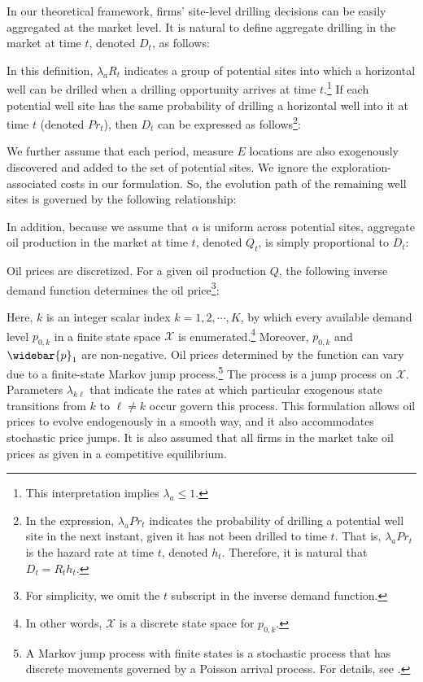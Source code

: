 In our theoretical framework, firms' site-level drilling decisions can be easily aggregated at the market level. It is natural to define aggregate drilling in the market at time $t$, denoted $D_{t}$, as follows:

In this definition, $\lambda_{a} R_{t}$ indicates a group of potential sites into which a horizontal well can be drilled when a drilling opportunity arrives at time $t$.\footnote{This interpretation implies $\lambda_{a} \leq 1$.} If each potential well site has the same probability of drilling a horizontal well into it at time $t$ (denoted $Pr_{t}$), then $D_{t}$ can be expressed as follows\footnote{In the expression, $\lambda_{a} Pr_{t}$ indicates the probability of drilling a potential well site in the next instant, given it has not been drilled to time $t$. That is, $\lambda_{a} Pr_{t}$ is the hazard rate at time $t$, denoted $h_{t}$. Therefore, it is natural that $D_{t} = R_{t} h_{t}$.}:

We further assume that each period, measure $E$ locations are also exogenously discovered and added to the set of potential sites. We ignore the exploration-associated costs in our formulation. So, the evolution path of the remaining well sites is governed by the following relationship:

In addition, because we assume that $\alpha$ is uniform across potential sites, aggregate oil production in the market at time $t$, denoted $Q_{t}$, is simply proportional to $D_{t}$:


Oil prices are discretized. For a given oil production $Q$, the following inverse demand function determines the oil price\footnote{For simplicity, we omit the $t$ subscript in the inverse demand function.}:

Here, $k$ is an integer scalar index $k = 1, 2, \cdots, K$, by which every available demand level $p_{0,k}$ in a finite state space $\mathcal{X}$ is enumerated.\footnote{In other words, $\mathcal{X}$ is a discrete state space for $p_{0,k}$.} Moreover, $p_{0,k}$ and $\widebar{p}_{1}$ are non-negative. Oil prices determined by the function can vary due to a finite-state Markov jump process.\footnote{A Markov jump process with finite states is a stochastic process that has discrete movements governed by a Poisson arrival process. For details, see \cite{Time-Discretization-of-Markov-Chains_Doytchinov-and-Irby_2010}.} The process is a jump process on $\mathcal{X}$. Parameters $\lambda_{k\ell}$ that indicate the rates at which particular exogenous state transitions from $k$ to $\ell \neq k$ occur govern this process. This formulation allows oil prices to evolve endogenously in a smooth way, and it also accommodates stochastic price jumps. It is also assumed that all firms in the market take oil prices as given in a competitive equilibrium. 


